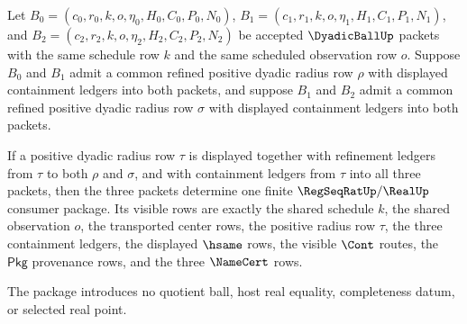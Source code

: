 \begin{theorem}
\label{thm:dyadicball-refinement-overlap-transitivity}
Let
$B_0=(c_0,r_0,k,o,\eta_0,H_0,C_0,P_0,N_0)$,
$B_1=(c_1,r_1,k,o,\eta_1,H_1,C_1,P_1,N_1)$, and
$B_2=(c_2,r_2,k,o,\eta_2,H_2,C_2,P_2,N_2)$ be accepted
$\DyadicBallUp$ packets with the same schedule row $k$ and the same scheduled
observation row $o$. Suppose $B_0$ and $B_1$ admit a common refined positive
dyadic radius row $\rho$ with displayed containment ledgers into both packets,
and suppose $B_1$ and $B_2$ admit a common refined positive dyadic radius row
$\sigma$ with displayed containment ledgers into both packets.

If a positive dyadic radius row $\tau$ is displayed together with refinement
ledgers from $\tau$ to both $\rho$ and $\sigma$, and with containment ledgers
from $\tau$ into all three packets, then the three packets determine one finite
$\RegSeqRatUp/\RealUp$ consumer package. Its visible rows are exactly the
shared schedule $k$, the shared observation $o$, the transported center rows,
the positive radius row $\tau$, the three containment ledgers, the displayed
$\hsame$ rows, the visible $\Cont$ routes, the $\mathsf{Pkg}$ provenance rows,
and the three $\NameCert$ rows.

The package introduces no quotient ball, host real equality, completeness
datum, or selected real point.
\end{theorem}
